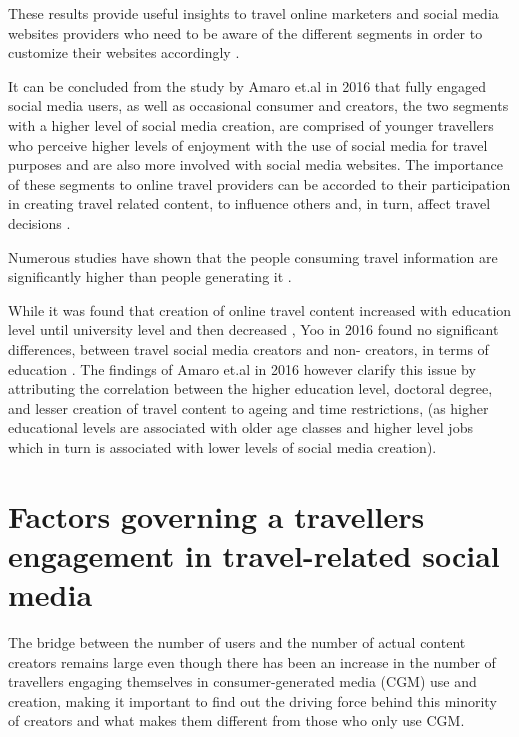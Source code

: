 These results provide useful insights to travel online marketers and social media websites providers who need to be aware of the different segments in order to customize their websites accordingly \cite{amaro2016travelers}.

It can be concluded from the study by Amaro et.al in 2016 that fully engaged social media users, as well as occasional consumer and creators, the two segments with a higher level of social media creation, are comprised of younger travellers who perceive higher levels of enjoyment with the use of social media for travel purposes and are also more involved with social media websites. The importance of these segments to online travel providers can be accorded to their participation in creating travel related content, to influence others and, in turn, affect travel decisions \cite{amaro2016travelers}.

Numerous studies have shown that the people consuming travel information are significantly higher than people generating it \cite{pan2012theoretical} \cite{YOO2011609}.  

While it was found that creation of online travel content increased with education level until university level and then decreased  \cite{ip2012profiling}, Yoo in 2016 found no significant differences, between travel social media creators and non- creators, in terms of education \cite{yoo2016use}. The findings of Amaro et.al in 2016 however clarify this issue by attributing the correlation between the higher education level, doctoral degree, and lesser creation of travel content to ageing and time restrictions, (as higher educational levels are associated with older age classes and higher level jobs which in turn is associated with lower levels of social media creation)\cite{amaro2016travelers}. 

		


\section{Factors governing a traveller\textquotesingle s engagement in travel-related social media}\label{2}
The bridge between the number of users and the number of actual content creators remains large even though there has been an increase in the number of travellers engaging themselves in consumer-generated media (CGM) use and creation, making it important to find out the driving force behind this minority of creators and what makes them different from those who only use CGM. \cite{yoo2011influence} 

